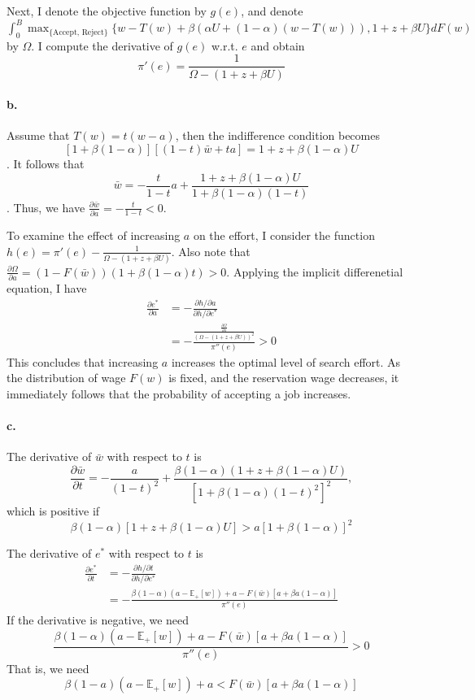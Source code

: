 \documentclass[11pt]{article}
\theoremstyle{definition}
\theoremstyle{boldtitle} %
\numberwithin{equation}{section}
\numberwithin{figure}{section}
\numberwithin{table}{section}
\begin{document}
Next, I denote the objective function by $g(e)$, and denote 
$\int_{0}^B \max_{\{\text{Accept, Reject}\}} \bigg\{ w - T(w) + \beta (\alpha U + (1 - \alpha) (w - T(w))), 1 + z + \beta U \bigg\} dF(w)$ by $\Omega$.
I compute the derivative of $g(e)$ w.r.t. $e$ and obtain 
\[
\pi'(e) = \frac{1}{\Omega - (1 + z + \beta U)}
\]


\paragraph{b.}
Assume that $T(w) = t(w -a)$, then the indifference condition becomes 
\[
\left[1 + \beta  (1 - \alpha)\right] \left[(1-t) \bar{w} + ta \right]  = 1 + z + \beta(1- \alpha) U
\].
It follows that 
\[
\bar{w} = - \frac{t}{1 - t} a + \frac{1 + z + \beta (1 - \alpha )U}{1 + \beta (1 - \alpha) (1 - t)}
\].
Thus, we have $\frac{\partial \bar{w}}{\partial a} = - \frac{t}{1 - t} < 0$.

To examine the effect of increasing $a$ on the effort, 
I consider the function $h(e) = \pi'(e) - \frac{1}{\Omega - (1 + z + \beta U)}$.
Also note that $\frac{\partial \Omega}{\partial a} = \left( 1 - F(\bar{w})\right)(1 + \beta (1 - \alpha)t) > 0$.
Applying the implicit differenetial equation, I have 
\begin{align*}
\frac{\partial e^*}{\partial a} & = -\frac{\partial h/ \partial a}{\partial h/ \partial e^*} \\ 
& = - \frac{\frac{\frac{\partial \Omega}{\partial a}}{(\Omega - (1 + z + \beta U))^2}}{\pi''(e)} > 0
\end{align*}
This concludes that increasing $a$ increases the optimal level of search effort.
As the distribution of wage $F(w)$ is fixed, and the reservation wage decreases,
it immediately follows that the probability of accepting a job increases.

\paragraph{c.} 
The derivative of $\bar{w}$ with respect to $t$ is 
\[
\frac{\partial \bar{w}}{\partial t} = - \frac{a}{(1 - t)^2} + \frac{\beta (1 - \alpha)(1 + z + \beta (1-\alpha) U)
}{
    \left[1 + \beta (1 - \alpha)(1-t)^2 \right]^2
},
\]
which is positive if 
\[
\beta (1 - \alpha) \left[1 + z + \beta (1 - \alpha) U\right] > a \left[1 + \beta (1 - \alpha)\right]^2
\]

The derivative of $e^*$ with respect to $t$ is 
\begin{align*}
    \frac{\partial e^*}{\partial t} & = -\frac{\partial h/ \partial t}{\partial h/ \partial e^*} \\  
    & = - \frac{\beta (1 - \alpha)(a - \mathbb{E}_+[w]) + a - F(\bar{w}) [a + \beta a (1 - \alpha)] }{\pi''(e)}
\end{align*}
If the derivative is negative, we need 
\[
\frac{\beta (1 - \alpha)(a - \mathbb{E}_+[w]) + a - F(\bar{w}) [a + \beta a (1 - \alpha)] }{\pi''(e)} > 0
\]
That is, we need 
\[
\beta (1 - a) (a - \mathbb{E}_+[w]) + a < F(\bar{w})[a + \beta a (1 - \alpha)]
\]
\end{document}
